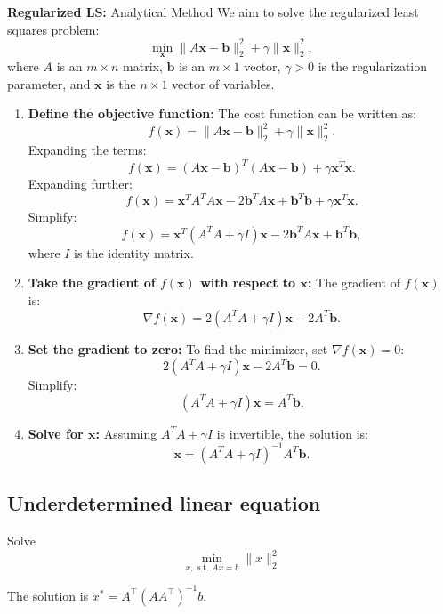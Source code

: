 \begin{example}
    \textbf{Regularized LS:} Analytical Method
    We aim to solve the regularized least squares problem:
    \[
    \min_{\mathbf{x}} \| A \mathbf{x} - \mathbf{b} \|_2^2 + \gamma \| \mathbf{x} \|_2^2,
    \]
    where \( A \) is an \( m \times n \) matrix, \(\mathbf{b}\) is an \( m \times 1 \) vector, \(\gamma > 0\) is the regularization parameter, and \(\mathbf{x}\) is the \( n \times 1 \) vector of variables.

    \begin{enumerate}
        \item \textbf{Define the objective function:} The cost function can be written as:
        \[
        f(\mathbf{x}) = \| A \mathbf{x} - \mathbf{b} \|_2^2 + \gamma \| \mathbf{x} \|_2^2.
        \]
        Expanding the terms:
        \[
        f(\mathbf{x}) = (A \mathbf{x} - \mathbf{b})^T (A \mathbf{x} - \mathbf{b}) + \gamma \mathbf{x}^T \mathbf{x}.
        \]
        Expanding further:
        \[
        f(\mathbf{x}) = \mathbf{x}^T A^T A \mathbf{x} - 2 \mathbf{b}^T A \mathbf{x} + \mathbf{b}^T \mathbf{b} + \gamma \mathbf{x}^T \mathbf{x}.
        \]
        Simplify:
        \[
        f(\mathbf{x}) = \mathbf{x}^T (A^T A + \gamma I) \mathbf{x} - 2 \mathbf{b}^T A \mathbf{x} + \mathbf{b}^T \mathbf{b},
        \]
        where \( I \) is the identity matrix.

        \item \textbf{Take the gradient of \( f(\mathbf{x}) \) with respect to \( \mathbf{x} \):}
        The gradient of \( f(\mathbf{x}) \) is:
        \[
        \nabla f(\mathbf{x}) = 2 (A^T A + \gamma I) \mathbf{x} - 2 A^T \mathbf{b}.
        \]

        \item \textbf{Set the gradient to zero:}
        To find the minimizer, set \(\nabla f(\mathbf{x}) = 0\):
        \[
        2 (A^T A + \gamma I) \mathbf{x} - 2 A^T \mathbf{b} = 0.
        \]
        Simplify:
        \[
        (A^T A + \gamma I) \mathbf{x} = A^T \mathbf{b}.
        \]

        \item \textbf{Solve for \(\mathbf{x}\):}
        Assuming \( A^T A + \gamma I \) is invertible, the solution is:
        \[
        \mathbf{x} = (A^T A + \gamma I)^{-1} A^T \mathbf{b}.
        \]
    \end{enumerate}
\end{example}


\subsection{Underdetermined linear equation}
\begin{definition}
    Solve 
    \begin{equation*}
        \min_{x, \text{ s.t. } Ax=b} \|x\|_2^2
    \end{equation*}

    The solution is  $x^* = A^\top (A A^\top)^{-1} b$.
\end{definition}

